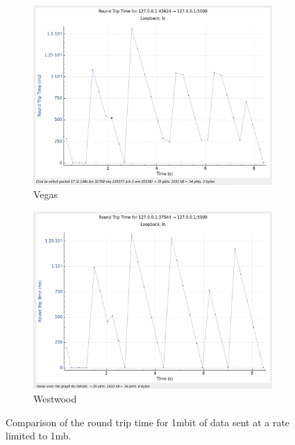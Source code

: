 \documentclass{report}
\begin{document}
\begin{figure}[H]
    \begin{subfigure}[b]{0.45\textwidth}
        \centering
        \includegraphics[width=\textwidth]{Pics/Vegas/r1mbit_s1m_rtt}
        \caption{Vegas}
    \end{subfigure}
    \hfill
    \begin{subfigure}[b]{0.45\textwidth}
        \centering
        \includegraphics[width=\textwidth]{Pics/Westwood/r1mbit_s1m_rtt}
        \caption{Westwood}
    \end{subfigure}
    \caption{Comparison of the round trip time for 1mbit of data sent at a rate limited to 1mb.}
    \label{fig:four_images}
\end{figure}
\end{document}
